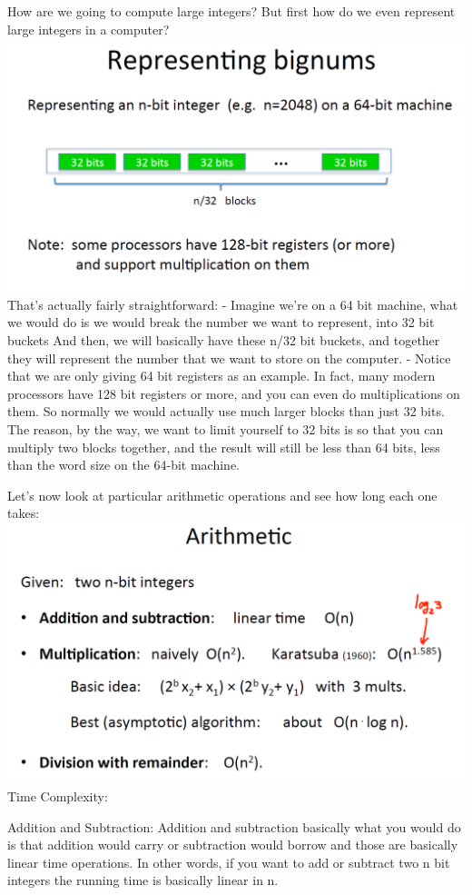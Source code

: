 \documentclass[11pt]{article}
\makeatletter
\def\maxwidth{\ifdim\Gin@nat@width>\linewidth\linewidth
    \else\Gin@nat@width\fi}
\let\Oldincludegraphics\includegraphics
\renewcommand{\includegraphics}[1]{\Oldincludegraphics[width=.8\maxwidth]{#1}}
\makeatother
\begin{document}
How are we going to compute large integers? But first how do we even
represent large integers in a computer?
\includegraphics{./Images/NT-RepresentingBigNums.png} That's actually
fairly straightforward: - Imagine we're on a 64 bit machine, what we
would do is we would break the number we want to represent, into 32 bit
buckets And then, we will basically have these n/32 bit buckets, and
together they will represent the number that we want to store on the
computer. - Notice that we are only giving 64 bit registers as an
example. In fact, many modern processors have 128 bit registers or more,
and you can even do multiplications on them. So normally we would
actually use much larger blocks than just 32 bits. The reason, by the
way, we want to limit yourself to 32 bits is so that you can multiply
two blocks together, and the result will still be less than 64 bits,
less than the word size on the 64-bit machine.

Let's now look at particular arithmetic operations and see how long each
one takes: \includegraphics{./Images/NT-Arithmetic.png} Time Complexity:

Addition and Subtraction: Addition and subtraction basically what you
would do is that addition would carry or subtraction would borrow and
those are basically linear time operations. In other words, if you want
to add or subtract two n bit integers the running time is basically
linear in n.
\end{document}
